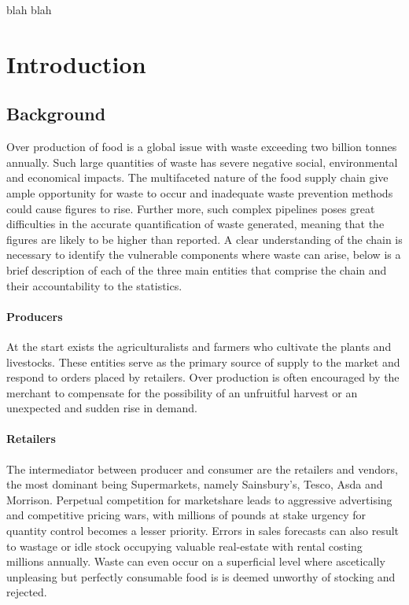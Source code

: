 \documentclass[a4paper, 11pt]{article}
\begin{document}
\clearpage
blah blah
\clearpage

\section{Introduction}

\subsection{Background}
Over production of food is a global issue with waste exceeding two billion tonnes annually\cite{globalIssue}. Such large quantities of waste has severe negative social, environmental and economical impacts. The multifaceted nature of the food supply chain give ample opportunity for waste to occur and inadequate waste prevention methods could cause figures to rise. Further more, such complex pipelines poses great difficulties in the accurate quantification of waste generated, meaning that the figures are likely to be higher than reported. A clear understanding of the chain is necessary to identify the vulnerable components where waste can arise, below is a brief description of each of the three main entities that comprise the chain and their accountability to the statistics.

\paragraph{Producers}At the start exists the agriculturalists and farmers who cultivate the plants and livestocks. These entities serve as the primary source of supply to the market and respond to orders placed by retailers. Over production is often encouraged by the merchant to compensate for the possibility of an unfruitful harvest or an unexpected and sudden rise in demand. 

\paragraph{Retailers}The intermediator between producer and consumer are the retailers and vendors, the most dominant being Supermarkets, namely Sainsbury's, Tesco, Asda and Morrison. Perpetual competition for marketshare leads to aggressive advertising and competitive pricing wars, with millions of pounds at stake urgency for quantity control becomes a lesser priority. Errors in sales forecasts can also result to wastage or idle stock occupying valuable real-estate with rental costing millions annually. Waste can even occur on a superficial level where ascetically unpleasing but perfectly consumable food is is deemed unworthy of stocking and rejected.
\end{document}
